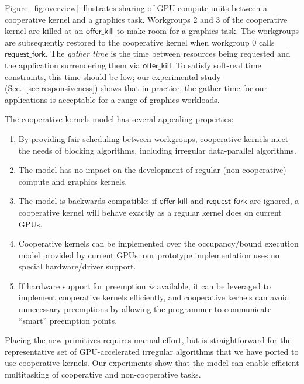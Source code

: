 \documentclass[sigconf]{acmart}
\newcommand{\myfiglong}{Figure~}
\newcommand{\mysec}{Sec.~}
\newcommand{\offerfork}{\mathsf{request\_fork}}
\newcommand{\offerkill}{\mathsf{offer\_kill}}
\begin{document}
\myfiglong{\ref{fig:overview}} illustrates sharing of GPU compute units between a cooperative kernel and a
graphics task. Workgroups 2 and 3 of the cooperative kernel
are killed at an $\offerkill$ to make room for a graphics
task. The workgroups are subsequently restored to the cooperative kernel when workgroup 0 calls $\offerfork$. The \emph{gather time} is the time
between resources being requested and the application surrendering them via $\offerkill$. To satisfy soft-real time
constraints, this time should be low; our experimental study
(\mysec{\ref{sec:responsiveness}}) shows that in practice, the
gather-time for our applications is acceptable for a range of graphics
workloads.

The cooperative kernels model has several appealing
properties:

\begin{enumerate}[leftmargin=*]

\item By providing fair scheduling between workgroups, cooperative
  kernels meet the needs of blocking algorithms, including irregular
  data-parallel algorithms.

\item The model has no impact on the development of regular
  (non-cooperative) compute and graphics kernels.

\item The model is backwards-compatible: if $\offerkill$ and $\offerfork$ are ignored, a cooperative kernel will behave
  exactly as a regular kernel does on current GPUs.

\item Cooperative kernels can be implemented over the occupancy\-/bound
  execution model provided by current GPUs: our prototype implementation uses no special hardware/driver support.

\item If hardware support for preemption \emph{is} available, it can be leveraged to implement cooperative kernels efficiently, and cooperative kernels can avoid unnecessary preemptions by allowing the programmer to communicate ``smart'' preemption points.

\end{enumerate}

Placing the new primitives requires manual effort, but is straightforward for the representative set of
GPU-accelerated irregular algorithms that we have ported to use cooperative kernels.  Our experiments show that the model can enable efficient multitasking of cooperative and non-cooperative tasks.
\end{document}
